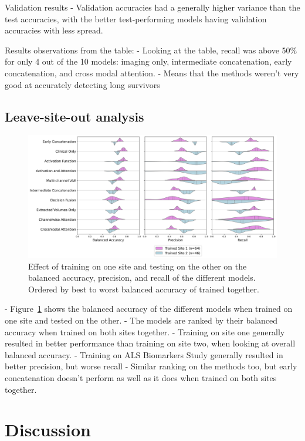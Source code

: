 Validation results
- Validation accuracies had a generally higher variance than the test accuracies, with the better test-performing models having validation accuracies with less spread.


Results observations from the table:
- Looking at the table, recall was above 50\% for only 4 out of the 10 models: imaging only, intermediate concatenation, early concatenation, and cross modal attention.
- Means that the methods weren't very good at accurately detecting long survivors


\subsection{Leave-site-out analysis}

\begin{figure}
    \centering
    \hspace*{-2cm}
    \includegraphics[width=1.2\textwidth]{figures/violinplot_site_effect}
    \caption{Effect of training on one site and testing on the other on the balanced accuracy, precision, and recall of the different models. Ordered by best to worst balanced accuracy of trained together.}
    \label{fig:site_effect}
\end{figure}

- Figure~\ref{fig:site_effect} shows the balanced accuracy of the different models when trained on one site and tested on the other.
- The models are ranked by their balanced accuracy when trained on both sites together.
- Training on site one generally resulted in better performance than training on site two, when looking at overall balanced accuracy.
- Training on ALS Biomarkers Study generally resulted in better precision, but worse recall
- Similar ranking on the methods too, but early concatenation doesn't perform as well as it does when trained on both sites together.


\section{Discussion}

